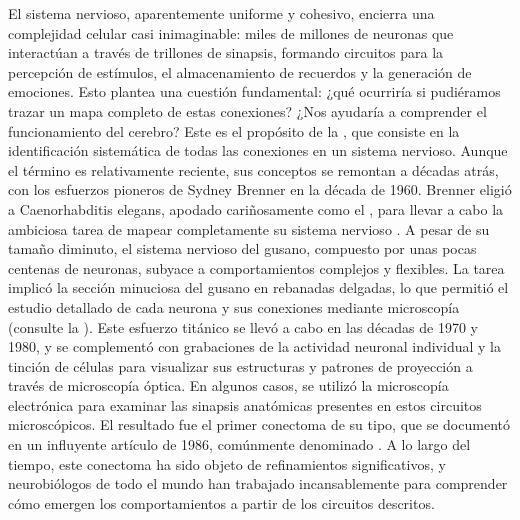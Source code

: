 El sistema nervioso, aparentemente uniforme y cohesivo, encierra una complejidad celular casi inimaginable: miles de millones de neuronas que interactúan a través de trillones de sinapsis, formando circuitos para la percepción de estímulos, el almacenamiento de recuerdos y la generación de emociones. Esto plantea una cuestión fundamental: ¿qué ocurriría si pudiéramos trazar un mapa completo de estas conexiones? ¿Nos ayudaría a comprender el funcionamiento del cerebro? Este es el propósito de la , que consiste en la identificación sistemática de todas las conexiones en un sistema nervioso. Aunque el término es relativamente reciente, sus conceptos se remontan a décadas atrás, con los esfuerzos pioneros de Sydney Brenner en la década de 1960. Brenner eligió a Caenorhabditis elegans, apodado cariñosamente como el , para llevar a cabo la ambiciosa tarea de mapear completamente su sistema nervioso \cite{portman_neural_2019}. A pesar de su tamaño diminuto, el sistema nervioso del gusano, compuesto por unas pocas centenas de neuronas, subyace a comportamientos complejos y flexibles. La tarea implicó la sección minuciosa del gusano en rebanadas delgadas, lo que permitió el estudio detallado de cada neurona y sus conexiones mediante microscopía (consulte la ). Este esfuerzo titánico se llevó a cabo en las décadas de 1970 y 1980, y se complementó con grabaciones de la actividad neuronal individual y la tinción de células para visualizar sus estructuras y patrones de proyección a través de microscopía óptica. En algunos casos, se utilizó la microscopía electrónica para examinar las sinapsis anatómicas presentes en estos circuitos microscópicos. El resultado fue el primer conectoma de su tipo, que se documentó en un influyente artículo de 1986, comúnmente denominado  \cite{white_structure_1997}. A lo largo del tiempo, este conectoma ha sido objeto de refinamientos significativos, y neurobiólogos de todo el mundo han trabajado incansablemente para comprender cómo emergen los comportamientos a partir de los circuitos descritos.


